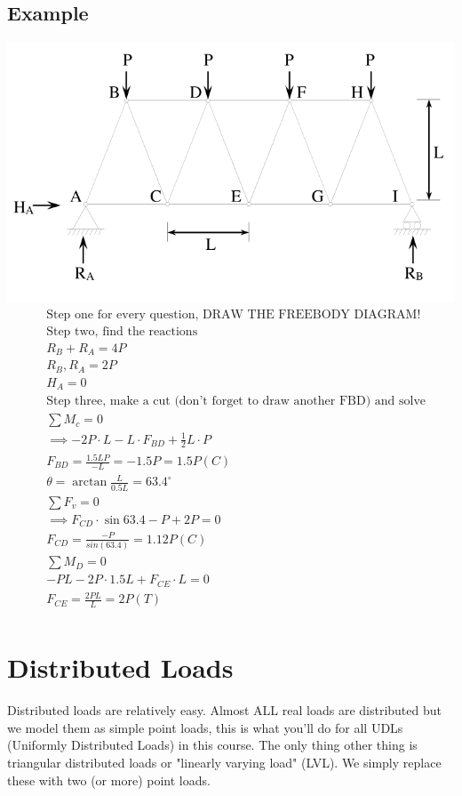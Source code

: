 \documentclass[a4paper, 12pt]{article}
\begin{document}
\subsection{Example}
\includegraphics[scale=0.5]{truss}
\begin{align*}
    &\text{Step one for every question, DRAW THE FREEBODY DIAGRAM!} \\
    &\text{Step two, find the reactions} \\
    &R_B + R_A = 4P \\
    &R_B, R_A = 2P \\
    &H_A = 0 \\
    &\text{Step three, make a cut (don't forget to draw another FBD) and solve} \\
    &\sum M_c = 0 \\
    &\implies -2P \cdot L - L \cdot F_{BD} + \frac{1}{2}L \cdot P \\
    &F_{BD} = \frac{1.5LP}{-L} = -1.5P = 1.5P (C) \\
    &\theta = \arctan{\frac{L}{0.5L}} = 63.4^{\circ} \\
    &\sum F_v = 0 \\
    &\implies F_{CD} \cdot \sin{63.4} - P + 2P = 0 \\
    &F_{CD} = \frac{-P}{sin(63.4)} = 1.12P (C) \\
    &\sum M_D = 0 \\
    &-PL - 2P \cdot 1.5L + F_{CE} \cdot L = 0 \\
    &F_{CE} = \frac{2PL}{L} = 2P (T) \\
\end{align*}

\section{Distributed Loads}
Distributed loads are relatively easy. Almost ALL real loads are distributed but we model them as 
simple point loads, this is what you'll do for all UDLs (Uniformly Distributed Loads) in this course. 
The only thing other thing is triangular distributed loads or "linearly varying load" (LVL). We simply 
replace these with two (or more) point loads.
\end{document}

